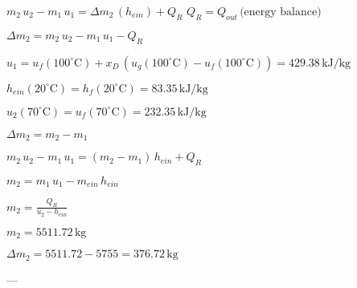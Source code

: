 \( m_2 \, u_2 - m_1 \, u_1 = \Delta m_2 \, (h_{ein}) + Q_{R} \)  
\( Q_{R} = Q_{out} \, \text{(energy balance)} \)  

\( \Delta m_2 = m_2 \, u_2 - m_1 \, u_1 - Q_{R} \)  

\( u_1 = u_f(100^\circ \text{C}) + x_D \, (u_g(100^\circ \text{C}) - u_f(100^\circ \text{C})) = 429.38 \, \text{kJ/kg} \)  

\( h_{ein}(20^\circ \text{C}) = h_f(20^\circ \text{C}) = 83.35 \, \text{kJ/kg} \)  

\( u_2(70^\circ \text{C}) = u_f(70^\circ \text{C}) = 232.35 \, \text{kJ/kg} \)  

\( \Delta m_2 = m_2 - m_1 \)  

\( m_2 \, u_2 - m_1 \, u_1 = (m_2 - m_1) \, h_{ein} + Q_{R} \)  

\( m_2 = m_1 \, u_1 - m_{ein} \, h_{ein} \)  

\( m_2 = \frac{Q_{R}}{u_2 - h_{ein}} \)  

\( m_2 = 5511.72 \, \text{kg} \)  

\( \Delta m_2 = 5511.72 - 5755 = 376.72 \, \text{kg} \)  

---